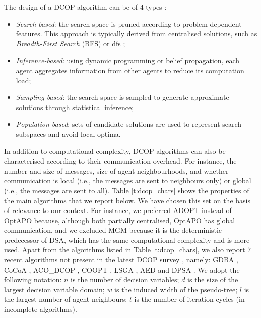 The design of a DCOP algorithm can be of $4$ types \cite{mahmud2020b,yeoh2010}:
\begin{itemize}
    \item \emph{Search-based}: the search space is pruned according to problem-dependent
        features. This approach is typically derived from centralised solutions,
        such as \emph{Breadth-First Search} (BFS) or \gls{dfs} \cite{cormen2009};
    \item \emph{Inference-based}: using dynamic programming or belief propagation, each
        agent aggregates information from other agents to reduce its computation load;
    \item \emph{Sampling-based}: the search space is sampled to generate approximate
        solutions through statistical inference;
    \item \emph{Population-based}: sets of candidate solutions are used to represent
        search subspaces and avoid local optima.
\end{itemize}
In addition to computational complexity, DCOP algorithms can also be characterised
according to their communication overhead. For instance, the number and size of messages,
size of agent neighbourhoods, and whether communication is local (i.e., the messages are
sent to neighbours only) or global (i.e., the messages are sent to all). Table
\ref{t:dcop_chars} shows the properties of the main algorithms that we report below. We
have chosen this set on the basis of relevance to our context. For instance, we preferred
ADOPT instead of OptAPO \cite{grinshpoun2008} because, although both partially
centralised, OptAPO has global communication, and we excluded MGM \cite{maheswaran2004a}
because it is the deterministic predecessor of DSA, which has the same computational
complexity and is more used.
Apart from the algorithms listed in Table \ref{t:dcop_chars}, we also report $7$ recent
algorithms not present in the latest DCOP survey \cite{fioretto2018survey}, namely: GDBA
\cite{okamoto2016}, CoCoA \cite{van2017}, ACO\_DCOP \cite{chen2018acodcop}, COOPT
\cite{leite2019b}, LSGA \cite{chen2020lsga}, AED \cite{mahmud2020a} and DPSA
\cite{mahmud2020b}.
We adopt the following notation: $n$ is the number of decision variables; $d$ is the size
of the largest decision variable domain; $w$ is the induced width of the pseudo-tree; $l$
is the largest number of agent neighbours; $t$ is the number of iteration cycles (in
incomplete algorithms).

